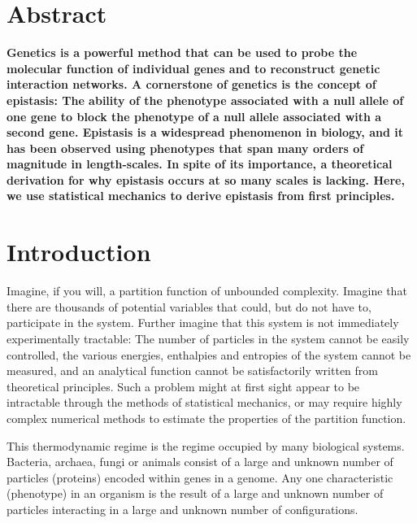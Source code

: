 
\newcommand{\Freg}{\( F_{reg} \)}
\newcommand{\pder}[3]{\frac{\partial^{#3} {#1}}
                           {\partial {#2}^{#3}}
                     } %
\newcommand{\tayX}[2]{\frac{#1^{#2}}{#2!}} %


\section*{Abstract}
\textbf{Genetics is a powerful method that can be used to probe the molecular
function of individual genes and to reconstruct genetic interaction networks. A
cornerstone of genetics is the concept of epistasis: The ability of the
phenotype associated with a null allele of one gene to block the phenotype of a
null allele associated with a second gene. Epistasis is a widespread phenomenon
in biology, and it has been observed using phenotypes that span many orders of
magnitude in length-scales. In spite of its importance, a theoretical derivation
for why epistasis occurs at so many scales is lacking. Here, we use statistical
mechanics to derive epistasis from first principles.
}

\section*{Introduction}
Imagine, if you will, a partition function of
unbounded complexity. Imagine that there are thousands of potential variables
that could, but do not have to, participate in the system. Further imagine that
this system is not immediately experimentally tractable: The number of particles
in the system cannot be easily controlled, the various energies, enthalpies and
entropies of the system cannot be measured, and an analytical function cannot be
satisfactorily written from theoretical principles. Such a problem might at
first sight appear to be intractable through the methods of statistical
mechanics, or may require highly complex numerical methods to estimate
the properties of the partition function.

This thermodynamic regime is the regime occupied by many biological systems.
Bacteria, archaea, fungi or animals consist of a large and unknown number of
particles (proteins) encoded within genes in a genome. Any one characteristic
(phenotype) in an organism is the result of a large and unknown number of
particles interacting in a large and unknown number of configurations.

